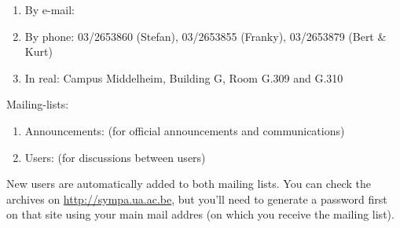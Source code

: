 \begin{enumerate}
\item  By e-mail:  \hpcinfo
\item  By phone: 03/2653860 (Stefan), 03/2653855 (Franky), 03/2653879 (Bert \& Kurt)
\item  In real: Campus Middelheim, Building G, Room G.309 and G.310
\end{enumerate}

Mailing-lists:

\begin{enumerate}
\item  Announcements: \hpcannounceml (for official announcements and communications)
\item  Users: \hpcusersml (for discussions between users)
\end{enumerate}

New users are automatically added to both mailing lists.
You can check the archives on \url{http://sympa.ua.ac.be}, but you'll need to
generate a password first on that site using your main mail addres (on which you
receive the mailing list).
